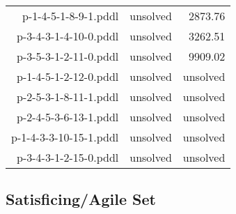 \documentclass{article}
\begin{document}
\begin{center}
\begin{tabular}{r|r|r}
 p-1-4-5-1-8-9-1.pddl&unsolved&2873.76\\
 p-3-4-3-1-4-10-0.pddl&unsolved&3262.51\\
 p-3-5-3-1-2-11-0.pddl&unsolved&9909.02\\
 p-1-4-5-1-2-12-0.pddl&unsolved&unsolved\\
 p-2-5-3-1-8-11-1.pddl&unsolved&unsolved\\
 p-2-4-5-3-6-13-1.pddl&unsolved&unsolved\\
 p-1-4-3-3-10-15-1.pddl&unsolved&unsolved\\
 p-3-4-3-1-2-15-0.pddl&unsolved&unsolved
                            \end{tabular}
                            \end{center}
                    

                    \subsection*{Satisficing/Agile Set}
                    
\end{document}
